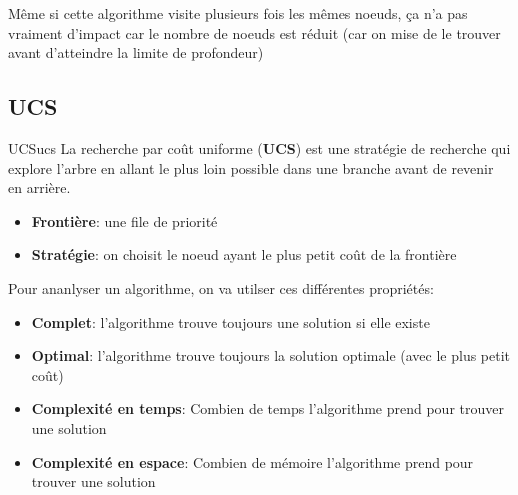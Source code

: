 \begin{remark}\leavevmode
    Même si cette algorithme visite plusieurs fois les mêmes noeuds, ça n'a pas vraiment d'impact
    car le nombre de noeuds est réduit (car on mise de le trouver avant d'atteindre la limite de profondeur)
\end{remark}



\subsection{UCS} %
\label{sub:ucs} 

\begin{definition}{UCS}{ucs}
    La recherche par coût uniforme (\textbf{UCS}) est une stratégie de recherche qui explore l'arbre en allant le plus loin possible dans une branche avant de revenir en arrière. 
    \begin{itemize}
        \item \textbf{Frontière}: une file de priorité
        \item \textbf{Stratégie}: on choisit le noeud ayant le plus petit coût de la frontière
    \end{itemize} 
\end{definition} 




Pour ananlyser un algorithme, on va utilser ces différentes propriétés:
\begin{itemize}
    \item \textbf{Complet}: l'algorithme trouve toujours une solution si elle existe
    \item \textbf{Optimal}: l'algorithme trouve toujours la solution optimale (avec le plus petit coût)
    \item \textbf{Complexité en temps}: Combien de temps l'algorithme prend pour trouver une solution
    \item \textbf{Complexité en espace}: Combien de mémoire l'algorithme prend pour trouver une solution
\end{itemize}

